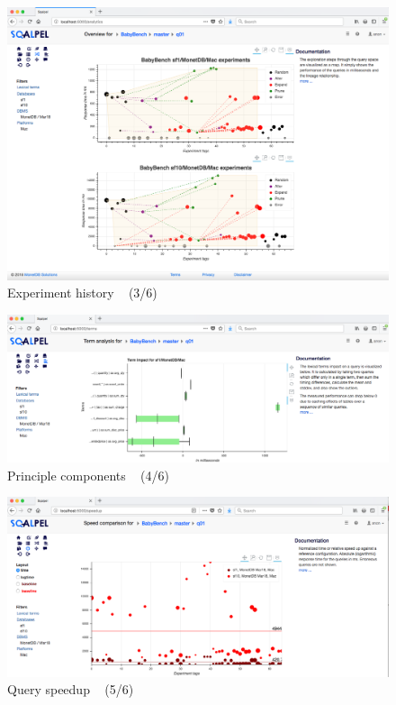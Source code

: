 \documentclass{cidr-2019}
\begin{document}

\begin{figure}[t!]
\centering
\includegraphics[width=\textwidth]{Figures/history2.png}
\caption{Experiment history ~ \textsf{(3/6)}
	\label{fig:history}}
\end{figure}



\begin{figure}[t!]
\centering
\includegraphics[width=.98\textwidth]{Figures/components2.png}
\caption{Principle components ~ \textsf{(4/6)}
	\label{fig:components}}
\end{figure}




\begin{figure}[t!]
\centering
\includegraphics[width=.98\textwidth]{Figures/speedup3.png}
\caption{Query speedup ~ \textsf{(5/6)}
	\label{fig:speedup2}}
\end{figure}
\end{document}
